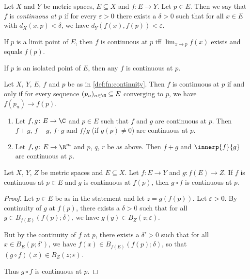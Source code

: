 \begin{definition*}[Continuity] \label{def:fn:continuity}
    Let $X$ and $Y$ be metric spaces, $E \subseteq X$ and $f\colon E \to Y$.
    Let $p \in E$.
    Then we say that $f$ is \emph{continuous at $p$} if for every
    $\varepsilon > 0$ there exists a $\delta > 0$ such that for all
    $x \in E$ with $d_X(x, p) < \delta$,
    we have $d_Y(f(x), f(p)) < \varepsilon$.
\end{definition*}
\begin{remarks}
    \item If $p$ is a limit point of $E$, then $f$ is continuous at $p$ iff
    $\lim_{x \to p} f(x)$ exists and equals $f(p)$.
    \item If $p$ is an isolated point of $E$,
    then any $f$ is continuous at $p$.
\end{remarks}

\begin{theorem}
\label{thm:fn:continuity:sequential}
    Let $X$, $Y$, $E$, $f$ and $p$ be as in \cref{def:fn:continuity}.
    Then $f$ is continuous at $p$ if and only if for every sequence
    $(p_n)_{n \in \N} \subseteq E$ converging to $p$,
    we have $f(p_n) \to f(p)$.
\end{theorem}
\begin{corollary} \leavevmode
    \begin{enumerate}
        \item Let $f, g\colon E \to \C$ and $p \in E$ such that
        $f$ and $g$ are continuous at $p$.
        Then $f + g$, $f - g$, $f \cdot g$ and $f / g$ (if $g(p) \ne 0$)
        are continuous at $p$.
        \item Let $f, g\colon E \to \R^m$ and $p$, $q$, $r$ be as above.
        Then $f + g$ and $\innerp{f}{g}$ are continuous at $p$.
    \end{enumerate}
\end{corollary}

\begin{exercise*}
\label{thm:fn:continuity:composition}
    Let $X$, $Y$, $Z$ be metric spaces and $E \subseteq X$.
    Let $f\colon E \to Y$ and $g\colon f(E) \to Z$.
    If $f$ is continuous at $p \in E$ and $g$ is continuous at $f(p)$,
    then $g \circ f$ is continuous at $p$.
\end{exercise*}
\begin{proof}
    Let $p \in E$ be as in the statement and let $z = g(f(p))$.
    Let $\varepsilon > 0$.
    By continuity of $g$ at $f(p)$, there exists a $\delta > 0$
    such that for all $y \in B_{f(E)}(f(p); \delta)$,
    we have $g(y) \in B_Z(z; \varepsilon)$.

    But by the continuity of $f$ at $p$, there exists a $\delta' > 0$
    such that for all $x \in B_E(p; \delta')$,
    we have $f(x) \in B_{f(E)}(f(p); \delta)$,
    so that $(g \circ f)(x) \in B_Z(z; \varepsilon)$.

    Thus $g \circ f$ is continuous at $p$.
\end{proof}
